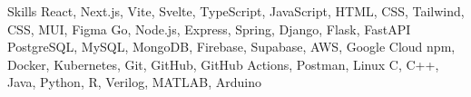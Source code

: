 
\begin{noprefixrubric}{Skills}
    React, Next.js, Vite, Svelte, TypeScript, JavaScript, HTML, CSS, Tailwind, CSS, MUI, Figma
    Go, Node.js, Express, Spring, Django, Flask, FastAPI
    PostgreSQL, MySQL, MongoDB, Firebase, Supabase, AWS, Google Cloud
    npm, Docker, Kubernetes, Git, GitHub, GitHub Actions, Postman, Linux
    C, C++, Java, Python, R, Verilog, MATLAB, Arduino
\end{noprefixrubric}
